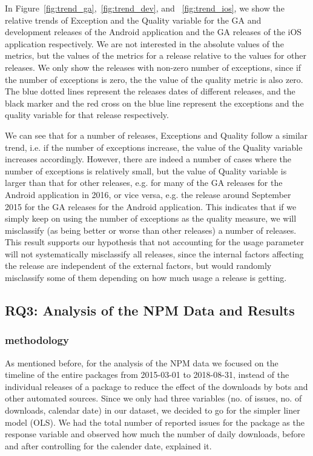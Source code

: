 \documentclass[smallcondensed]{svjour3}     %
\begin{document}
In Figure~\ref{fig:trend_ga},~\ref{fig:trend_dev}, and ~\ref{fig:trend_ios}, we show the relative trends of Exception and the Quality variable for the GA and development releases of the Android application and the GA releases of the iOS application respectively. We are not interested in the absolute values of the metrics, but the values of the metrics for a release relative to the values for other releases. We only show the releases with non-zero number of exceptions, since if the number of exceptions is zero, the the value of the quality metric is also zero. The blue dotted lines represent the releases dates of different releases, and the black marker and the red cross on the blue line represent the exceptions and the quality variable for that release respectively.

We can see that for a number of releases, Exceptions and Quality follow a similar trend, i.e. if the number of exceptions increase, the value of the Quality variable increases accordingly. However, there are indeed a number of cases where the number of exceptions is relatively small, but the value of Quality variable is larger than that for other releases, e.g. for many of the GA releases for the Android application in 2016, or vice versa, e.g. the release around September 2015 for the  GA releases for the Android application. This indicates that if we simply keep on using the number of exceptions as the quality measure, we will misclassify (as being better or worse than other releases) a number of releases. This result supports our hypothesis that not accounting for the usage parameter will not systematically misclassify all releases, since the internal factors affecting the release are independent of the external factors, but would randomly misclassify some of them depending on how much usage a release is getting.

\subsection{RQ3: Analysis of the NPM Data and Results}\label{s:npm}

\subsubsection{methodology}

As mentioned before, for the analysis of the NPM data we focused on the timeline of the entire packages from 2015-03-01 to 2018-08-31, instead of the individual releases of a package to reduce the effect of the downloads by bots and other automated sources. Since we only had  three variables (no. of issues, no. of downloads, calendar date) in our dataset, we decided to go for the simpler liner model (OLS). We had the total number of reported issues for the package as the response variable and observed how much the number of daily downloads, before and after controlling for the calender date, explained it. 
 
\end{document}
